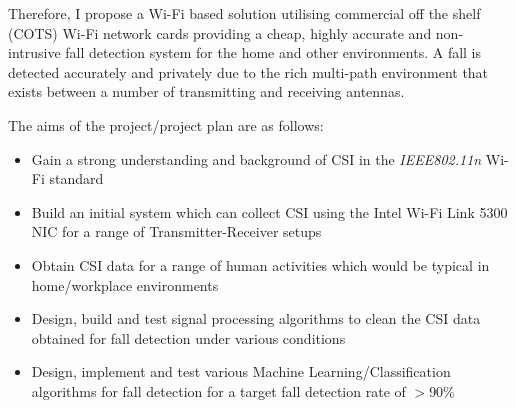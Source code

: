 Therefore, I propose a Wi-Fi based solution utilising commercial off the shelf (COTS) Wi-Fi network cards providing a cheap, highly accurate and non-intrusive fall detection system for the home and other environments. A fall is detected accurately and privately due to the rich multi-path environment that exists between a number of transmitting and receiving antennas. \par
\begin{comment}Previous research papers have explored the use of the Channel State Information (CSI) of a WLAN Channel for fall detection.\end{comment} 
The aims of the project/project plan are as follows: 
\vspace{-11pt}
\begin{itemize}[noitemsep, topsep=0pt]
\item Gain a strong understanding and background of CSI in the \textit{IEEE802.11n} Wi-Fi standard 
\item Build an initial system which can collect CSI using the Intel Wi-Fi Link 5300 NIC for a range of Transmitter-Receiver setups
\item Obtain CSI data for a range of human activities which would be typical in home/workplace environments
\item Design, build and test signal processing algorithms to clean the CSI data obtained for fall detection under various conditions
\item Design, implement and test various Machine Learning/Classification algorithms for fall detection for a target fall detection rate of $>$90\%
\end{itemize}
